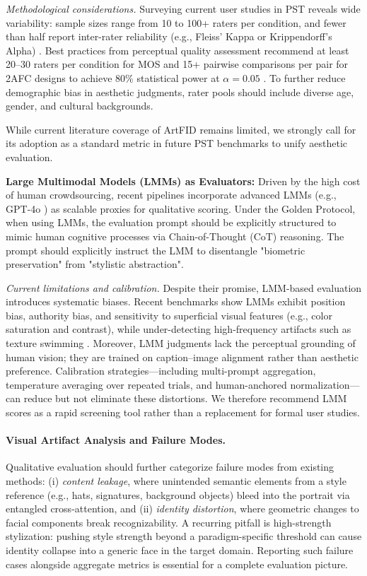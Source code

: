 \documentclass[journal]{IEEEtran}
\begin{document}
\emph{Methodological considerations.} Surveying current user studies in PST reveals wide variability: sample sizes range from 10 to 100+ raters per condition, and fewer than half report inter-rater reliability (e.g., Fleiss' Kappa or Krippendorff's Alpha) \cite{selim2016portrait,yi2019apdrawinggan}. Best practices from perceptual quality assessment recommend at least 20--30 raters per condition for MOS and 15+ pairwise comparisons per pair for 2AFC designs to achieve 80\% statistical power at $\alpha = 0.05$ \cite{streijl2016mean}. To further reduce demographic bias in aesthetic judgments, rater pools should include diverse age, gender, and cultural backgrounds.

While current literature coverage of ArtFID remains limited, we strongly call for its adoption as a standard metric in future PST benchmarks to unify aesthetic evaluation.

\textbf{Large Multimodal Models (LMMs) as Evaluators:} Driven by the high cost of human crowdsourcing, recent pipelines incorporate advanced LMMs (e.g., GPT-4o \cite{hurst2024gpt4o}) as scalable proxies for qualitative scoring. Under the Golden Protocol, when using LMMs, the evaluation prompt should be explicitly structured to mimic human cognitive processes via Chain-of-Thought (CoT) reasoning. The prompt should explicitly instruct the LMM to disentangle "biometric preservation" from "stylistic abstraction".

\emph{Current limitations and calibration.} Despite their promise, LMM-based evaluation introduces systematic biases. Recent benchmarks show LMMs exhibit position bias, authority bias, and sensitivity to superficial visual features (e.g., color saturation and contrast), while under-detecting high-frequency artifacts such as texture swimming \cite{chen2024mllmjudge}. Moreover, LMM judgments lack the perceptual grounding of human vision; they are trained on caption--image alignment rather than aesthetic preference. Calibration strategies---including multi-prompt aggregation, temperature averaging over repeated trials, and human-anchored normalization---can reduce but not eliminate these distortions. We therefore recommend LMM scores as a rapid screening tool rather than a replacement for formal user studies.

\paragraph{Visual Artifact Analysis and Failure Modes.}
Qualitative evaluation should further categorize failure modes from existing methods: (i) \textit{content leakage}, where unintended semantic elements from a style reference (e.g., hats, signatures, background objects) bleed into the portrait via entangled cross-attention, and (ii) \textit{identity distortion}, where geometric changes to facial components break recognizability. A recurring pitfall is high-strength stylization: pushing style strength beyond a paradigm-specific threshold can cause identity collapse into a generic face in the target domain. Reporting such failure cases alongside aggregate metrics is essential for a complete evaluation picture.
\end{document}

